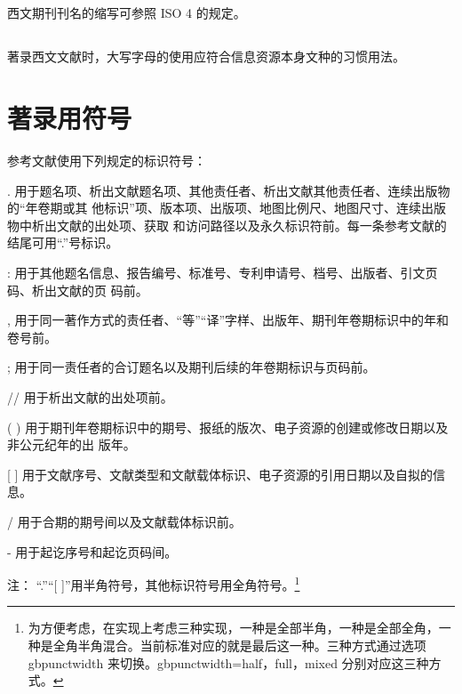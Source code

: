 \documentclass{article}
\begin{document}
\subsection{} 西文期刊刊名的缩写可参照 ISO 4 的规定。

\subsection{} 著录西文文献时，大写字母的使用应符合信息资源本身文种的习惯用法。

\section{著录用符号}

参考文献使用下列规定的标识符号：

. 用于题名项、析出文献题名项、其他责任者、析出文献其他责任者、连续出版物的“年卷期或其
他标识”项、版本项、出版项、地图比例尺、地图尺寸、连续出版物中析出文献的出处项、获取
和访问路径以及永久标识符前。每一条参考文献的结尾可用“.”号标识。

: 用于其他题名信息、报告编号、标准号、专利申请号、档号、出版者、引文页码、析出文献的页
码前。

, 用于同一著作方式的责任者、“等”“译”字样、出版年、期刊年卷期标识中的年和卷号前。

; 用于同一责任者的合订题名以及期刊后续的年卷期标识与页码前。

// 用于析出文献的出处项前。

( ) 用于期刊年卷期标识中的期号、报纸的版次、电子资源的创建或修改日期以及非公元纪年的出
版年。

[ ] 用于文献序号、文献类型和文献载体标识、电子资源的引用日期以及自拟的信息。

/ 用于合期的期号间以及文献载体标识前。

- 用于起讫序号和起讫页码间。

注： “.”“[ ]”用半角符号，其他标识符号用全角符号。\footnote{为方便考虑，在实现上考虑三种实现，一种是全部半角，一种是全部全角，一种是全角半角混合。当前标准对应的就是最后这一种。三种方式通过选项 gbpunctwidth 来切换。gbpunctwidth=half，full，mixed 分别对应这三种方式。}




\end{document}
